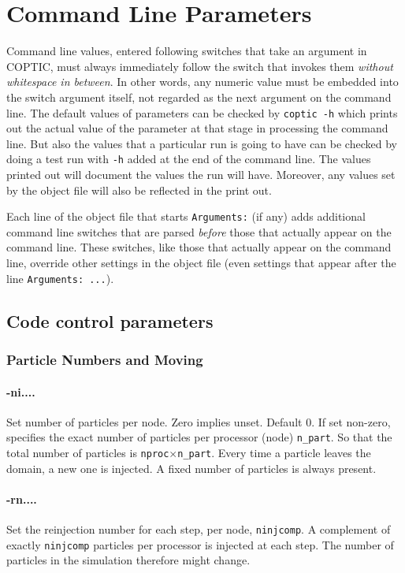 \documentclass[12pt]{article}
\begin{document}
\section{Command Line Parameters}\label{cmdline}

Command line values, entered following switches that take an argument
in COPTIC, must always immediately follow the switch that invokes them
\emph{without whitespace in between}. In other words, any numeric
value must be embedded into the switch argument itself, not regarded
as the next argument on the command line.  The default values of
parameters can be checked by \verb!coptic -h! which prints out the
actual value of the parameter at that stage in processing the command
line. But also the values that a particular run is going to have can
be checked by doing a test run with \verb!-h! added at the end of the
command line. The values printed out will document the values the run
will have. Moreover, any values set by the object file will also be
reflected in the print out.

Each line of the object file that starts \verb!Arguments:! (if any)
adds additional command line switches that are parsed \emph{before}
those that actually appear on the command line.  These switches, like
those that actually appear on the command line, override other
settings in the object file (even settings that appear after the line
\verb!Arguments: ...!).

\subsection{Code control parameters}

\subsubsection*{Particle Numbers and Moving}

\paragraph{-ni....} Set number of particles per node. Zero implies
unset. Default 0.
If set non-zero, specifies the exact number of particles per processor
(node) \verb!n_part!. So that the total number of particles is \verb!nproc!$\times$\verb!n_part!. Every time a particle leaves the domain, a new one is
injected. A fixed number of particles is always present.

\paragraph{-rn....} Set the reinjection number for each step, per
node, \verb!ninjcomp!. 
A complement of exactly \verb!ninjcomp! particles per processor is injected
at each step. The number of particles in the simulation therefore
might change.
\end{document}
